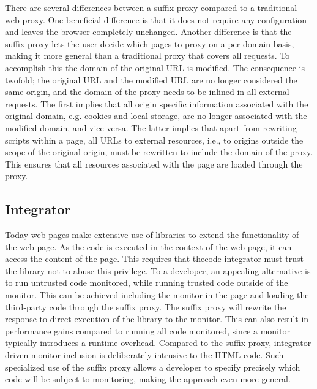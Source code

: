\documentclass{llncs}
\begin{document}
There are several differences between a suffix proxy compared to a traditional 
web proxy. One beneficial difference is that it does not require any configuration and leaves the browser 
completely unchanged. Another difference is that the suffix proxy lets the user decide which pages to proxy on a 
per-domain basis, making it more general than a traditional proxy that covers 
all requests. To accomplish this the domain of the original URL is modified.
The consequence is twofold; the original URL and the modified URL are no longer 
considered the same origin, and the domain of the proxy needs to 
be inlined in all external requests. The first implies that all origin specific 
information associated with the original domain, e.g. cookies and local storage, 
are no longer associated with the modified domain, and vice versa. 
The latter implies that apart from rewriting scripts within a page, all URLs to 
external resources, i.e., to origins outside the scope of the original origin, 
must be rewritten to include the domain of the proxy. This ensures that all 
resources associated with the page are loaded through the proxy.



\subsection{Integrator}


Today web pages make extensive use of libraries to extend the functionality of 
the web page. As the code is executed in the context of the web page, it can 
access the content of the page. This requires that thecode integrator must 
trust the library not to abuse this privilege. To a developer, an appealing alternative 
is to run untrusted code monitored, while running trusted code outside of the 
monitor. This can be achieved including the monitor in the page and loading the 
third-party code through the suffix proxy. The suffix proxy will rewrite the 
response to direct execution of the library to the monitor. This can also result in performance 
gains compared to running all code monitored, since a monitor typically introduces 
a runtime overhead. Compared to the suffix proxy, integrator driven monitor 
inclusion is deliberately intrusive to the HTML code. Such specialized use of the suffix 
proxy allows a developer to specify precisely which code will be subject to 
monitoring, making the approach even more general. 
\end{document}
